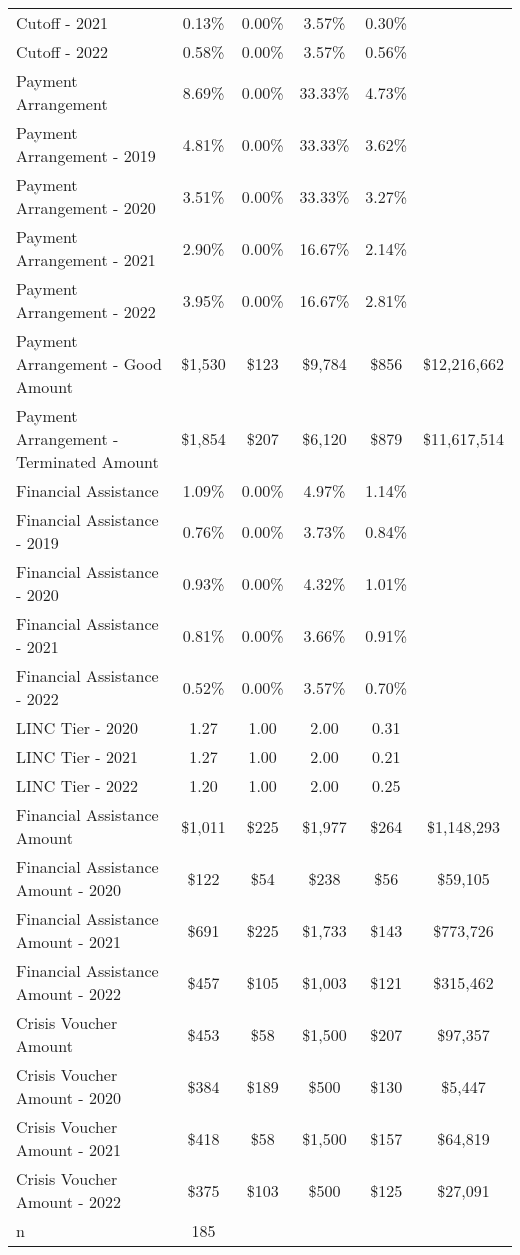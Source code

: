 \begin{tabular}{l|c|c|c|c|c}
\quad Cutoff - 2021 & 0.13\% & 0.00\% & 3.57\% & 0.30\% \\
\quad Cutoff - 2022 & 0.58\% & 0.00\% & 3.57\% & 0.56\% \\
\midrule 
Payment Arrangement & 8.69\% & 0.00\% & 33.33\% & 4.73\% \\
\quad Payment Arrangement - 2019 & 4.81\% & 0.00\% & 33.33\% & 3.62\% \\
\quad Payment Arrangement - 2020 & 3.51\% & 0.00\% & 33.33\% & 3.27\% \\
\quad Payment Arrangement - 2021 & 2.90\% & 0.00\% & 16.67\% & 2.14\% \\
\quad Payment Arrangement - 2022 & 3.95\% & 0.00\% & 16.67\% & 2.81\% \\
\quad Payment Arrangement - Good Amount & \$1,530 & \$123 & \$9,784 & \$856 & \$12,216,662 \\
\quad Payment Arrangement - Terminated Amount & \$1,854 & \$207 & \$6,120 & \$879 & \$11,617,514 \\
\midrule 
Financial Assistance & 1.09\% & 0.00\% & 4.97\% & 1.14\% \\
\quad Financial Assistance - 2019 & 0.76\% & 0.00\% & 3.73\% & 0.84\% \\
\quad Financial Assistance - 2020 & 0.93\% & 0.00\% & 4.32\% & 1.01\% \\
\quad Financial Assistance - 2021 & 0.81\% & 0.00\% & 3.66\% & 0.91\% \\
\quad Financial Assistance - 2022 & 0.52\% & 0.00\% & 3.57\% & 0.70\% \\
\midrule 
LINC Tier - 2020 & 1.27 & 1.00 & 2.00 & 0.31 \\
LINC Tier - 2021 & 1.27 & 1.00 & 2.00 & 0.21 \\
LINC Tier - 2022 & 1.20 & 1.00 & 2.00 & 0.25 \\
\midrule 
Financial Assistance Amount & \$1,011 & \$225 & \$1,977 & \$264 & \$1,148,293 \\
\quad Financial Assistance Amount - 2020 & \$122 & \$54 & \$238 & \$56 & \$59,105 \\
\quad Financial Assistance Amount - 2021 & \$691 & \$225 & \$1,733 & \$143 & \$773,726 \\
\quad Financial Assistance Amount - 2022 & \$457 & \$105 & \$1,003 & \$121 & \$315,462 \\
\midrule 
Crisis Voucher Amount & \$453 & \$58 & \$1,500 & \$207 & \$97,357 \\
\quad Crisis Voucher Amount - 2020 & \$384 & \$189 & \$500 & \$130 & \$5,447 \\
\quad Crisis Voucher Amount - 2021 & \$418 & \$58 & \$1,500 & \$157 & \$64,819 \\
\quad Crisis Voucher Amount - 2022 & \$375 & \$103 & \$500 & \$125 & \$27,091 \\
\midrule 
n & 185 &  &  &  &  \\
\midrule 
\bottomrule 
\end{tabular}
